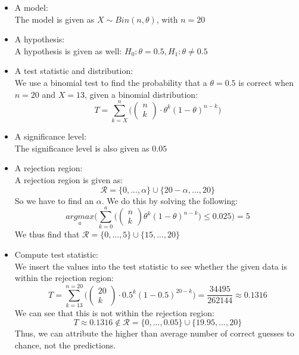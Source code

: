 \begin{itemize}
\item A model: \\
The model is given as $X \sim Bin(n,\theta)$, with $n = 20$
\item A hypothesis: \\
A hypothesis is given as well: $H_0: \theta = 0.5, H_1: \theta \neq 0.5$
\item A test statistic and distribution: \\
We use a binomial test to find the probability that a $\theta = 0.5$ is correct when $n = 20$ and $X = 13$, given a binomial distribution:
$$
T = \sum_{k = X}^{n} \Bigg( \begin{pmatrix} n \\ k \end{pmatrix} \cdot \theta^k (1-\theta)^{n-k}\Bigg)
$$
\item A significance level: \\
The significance level is also given as $0.05$
\item A rejection region: \\
A rejection region is given as:
$$
\mathcal{R}=\{0,...,\alpha\}\cup\{20-\alpha,...,20\}
$$
So we have to find an $\alpha$. We do this by solving the following:
$$
\underset{a}{argmax} \Bigg(\sum_{k=0}^a\Bigg(\begin{pmatrix} n \\ k \end{pmatrix} \theta^k (1-\theta)^{n-k}\Bigg) \leq 0.025 \Bigg) = 5
$$
We thus find that $\mathcal{R}=\{0,...,5\}\cup\{15,...,20\}$
\item Compute test statistic: \\
We insert the values into the test statistic to see whether the given data is within the rejection region:
$$
T = \sum_{k = 13}^{n=20} \Bigg( \begin{pmatrix} 20 \\ k \end{pmatrix} \cdot 0.5^k (1-0.5)^{20-k}\Bigg) = \frac{34495}{262144} \approx 0.1316
$$
We can see that this is not within the rejection region:
$$
T \approx 0.1316 \not\in \mathcal{R} = \{0,...,0.05\} \cup \{19.95,...,20\}
$$
Thus, we can attribute the higher than average number of correct guesses to chance, not the predictions.
\end{itemize}